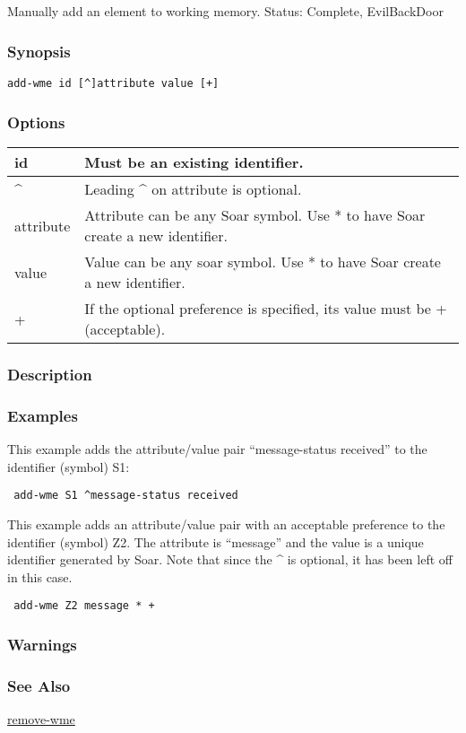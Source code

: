 \subsection{}
\label{add-wme}
Manually add an element to working memory. 
 Status: Complete, EvilBackDoor
\subsubsection*{Synopsis}
  \begin{verbatim}
add-wme id [^]attribute value [+]
\end{verbatim}
\subsubsection*{Options}
\begin{tabular}{|l|l|}
\hline 
 id  & Must be an existing identifier.  \\
 \hline 
 \^{}  & Leading \^{} on attribute is optional.  \\
 \hline 
 attribute  & Attribute can be any Soar symbol. Use * to have Soar create a new identifier.  \\
 \hline 
 value  & Value can be any soar symbol. Use * to have Soar create a new identifier.  \\
 \hline 
 +  & If the optional preference is specified, its value must be + (acceptable).  \\
 \hline 
\end{tabular}
\subsubsection*{Description}
\subsubsection*{Examples}
 This example adds the attribute/value pair ``message-status received'' to the identifier (symbol) S1: \begin{verbatim}
 add-wme S1 ^message-status received
\end{verbatim}
 This example adds an attribute/value pair with an acceptable preference to the identifier (symbol) Z2. The attribute is ``message'' and the value is a unique identifier generated by Soar. Note that since the \^{} is optional, it has been left off in this case. \begin{verbatim}
 add-wme Z2 message * + 
\end{verbatim}
\subsubsection*{Warnings}
\subsubsection*{See Also}
\hyperref[remove-wme]{remove-wme} 